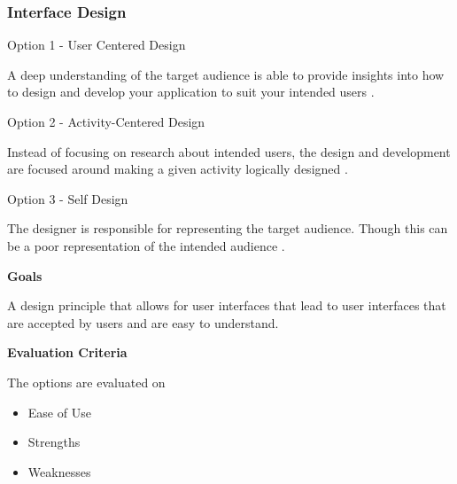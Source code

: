 \documentclass[letterpaper, 10pt, draftclsnofoot, compsoc, onecolumn]{IEEEtran}
\begin{document}
{\newpage
\subsubsection{Interface Design}
{\noindent Option 1 - User Centered Design \par}
{\noindent A deep understanding of the target audience is able to provide insights into how to design and develop your application to suit your intended users \cite{Usability}. \par}

\medskip
{\noindent Option 2 - Activity-Centered Design  \par}
{\noindent Instead of focusing on research about intended users, the design and development are focused around making a given activity logically designed \cite{AListApart}. \par}

\medskip
{\noindent Option 3 - Self Design \par}
{\noindent The designer is responsible for representing the target audience. Though this can be a poor representation of the intended audience \cite{AListApart}.\par}

\medskip
{\noindent\rmfamily\bfseries\color{black} Goals \par}
{\noindent A design principle that allows for user interfaces that lead to user interfaces that are accepted by users and are easy to understand.\par}

\medskip
{\noindent\rmfamily\bfseries\color{black} Evaluation Criteria \par}
{\noindent The options are evaluated on

\begin{itemize}
\item Ease of Use
\item Strengths
\item Weaknesses

\end{itemize}

\par}

\vspace{2pc}

}
\end{document}
